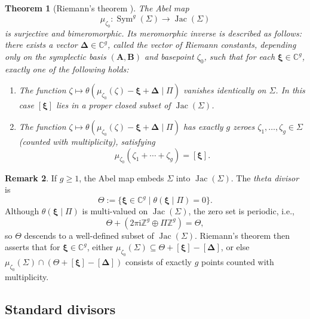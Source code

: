 \documentclass[12pt]{amsart}
\numberwithin{equation}{section}
\newtheorem{theorem}{Theorem}[section]
\theoremstyle{definition}
\newtheorem{remark}[theorem]{Remark}
\newcommand{\Z}{\mathbb{Z}}
\newcommand{\C}{\mathbb{C}}
\def\imunit{{\mathrm{i}}}
\def\sym{\operatorname{Sym}}
\def\jac{{\operatorname{Jac}}}
\def\vecRC{\bm{\Delta}}
\def\vecptjac{\bm{\xi}}
\def\ptCg{\vecptjac}
\def\ptSig{\zeta}
\def\basept{{\ptSig_0}}
\def\mcurve{\Sigma}
\begin{document}
\begin{theorem}[Riemann's theorem {\cite[Thm.~3.1]{Tata1}}] 
\label{thm:Riemann}
The Abel map
\[
\mu_\basept : \sym^g(\mcurve) \rightarrow \jac(\mcurve)
\]
is surjective and bimeromorphic.  
Its meromorphic inverse is described as follows: there exists a vector $\vecRC \in \C^{g}$, called the \emph{vector of Riemann constants}, depending only on the symplectic basis $(\bm A,\bm B)$ and basepoint $\basept$, such that for each $\vecptjac \in \C^{g}$, exactly one of the following holds:
\begin{enumerate}[label=(\arabic*)]
    \item\label{RT1} The function 
    $
    \ptSig \mapsto \theta(\mu_\basept(\ptSig) - \vecptjac + \vecRC \mid \Pi)
    $
    vanishes identically on $\mcurve$. In this case $[\ptCg]$ lies in a proper closed subset of $\jac(\mcurve)$.
    
    \item\label{RT2} The function 
    $
    \ptSig \mapsto \theta(\mu_\basept(\ptSig) - \vecptjac + \vecRC \mid \Pi)
    $
    has exactly $g$ zeroes $\ptSig_1,\dots,\ptSig_g \in \mcurve$ (counted with multiplicity), satisfying
    \[
    \mu_\basept(\ptSig_1 + \cdots + \ptSig_g) = [\ptCg].
    \]
\end{enumerate}
\end{theorem}





\begin{remark}\label{remark:theta_divisor}
If $g \ge 1$, the Abel map embeds $\mcurve$ into $\jac(\mcurve)$. The \emph{theta divisor} is
\[
\Theta := \{ \ptCg \in \C^{g} \mid \theta(\ptCg \mid \Pi)=0 \}.
\]
Although $\theta(\ptCg \mid \Pi)$ is multi-valued on $\jac(\mcurve)$, the zero set is periodic, i.e.,
\[
\Theta + (2\pi \imunit \Z^{g} \oplus \Pi \Z^{g}) = \Theta,
\]
so $\Theta$ descends to a well-defined subset of $\jac(\mcurve)$. Riemann’s theorem then asserts that for $\vecptjac \in \C^{g}$, either 
$\mu_\basept(\mcurve) \subseteq \Theta + [\vecptjac] - [\vecRC]$, 
or else $\mu_\basept(\mcurve) \cap (\Theta + [\vecptjac] - [\vecRC])$ consists of exactly $g$ points counted with multiplicity. 
\end{remark}




\subsection{Standard divisors} \label{sec:standard_divisors}
\end{document}
